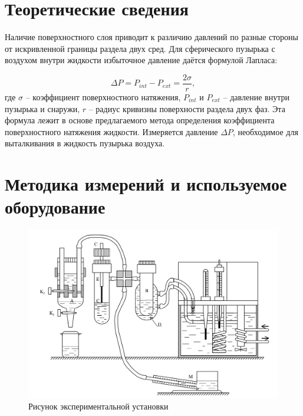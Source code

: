 \documentclass[a4paper, 12pt]{article}
\begin{document}
    \section*{Теоретические сведения}

        \noindent Наличие поверхностного слоя приводит к различию давлений по разные стороны от искривленной границы раздела двух сред.  Для сферического пузырька с воздухом  внутри жидкости избыточное давление даётся формулой Лапласа:

        \begin{equation}
            \label{key}
            \Delta P = P_{int} - P_{ext} = \frac{2\sigma}{r},
        \end{equation}
        \noindent где $\sigma$ -- коэффициент поверхностного натяжения, $P_{int}$ и $P_{ext}$ -- давление внутри пузырька и снаружи, $r$ -- радиус кривизны поверхности раздела двух фаз. Эта формула лежит в основе предлагаемого метода определения коэффициента поверхностного натяжения жидкости. Измеряется давление $\Delta P$, необходимое для выталкивания в жидкость пузырька воздуха.

    \section*{Методика измерений и используемое оборудование}

    \begin{figure}[H]
        \centering
        \includegraphics[width=15cm]{images/installation.png}
        \caption{Рисунок экспериментальной установки}
        \label{img:ust}
    \end{figure}
\end{document}
